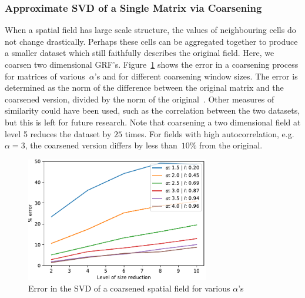 \documentclass[ijgi,article,submit,moreauthors,pdftex,10pt,a4paper]{Definitions/mdpi}
\begin{document}
\subsubsection{Approximate SVD of a Single Matrix via Coarsening}
\label{sec:Results/Approximate SVD of a Single Matrix via Coarsening}
When a spatial field has large scale structure, the values of neighbouring cells do not change drastically. Perhaps these cells can be aggregated together to produce a smaller dataset which still faithfully describes the original field. Here, we coarsen two dimensional GRF's. Figure~\ref{fig:plotSingleSpatialFieldViaCoarsening} shows the error in a coarsening process for matrices of various~$\alpha$'s and for different coarsening window sizes. The error is determined as the norm of the difference between the original matrix and the coarsened version, divided by the norm of the original~\cite{Bogaardt2018}. Other measures of similarity could have been used, such as the correlation between the two datasets, but this is left for future research. Note that coarsening a two dimensional field at level 5 reduces the dataset by $25$ times. For fields with high autocorrelation, e.g. $\alpha=3$, the coarsened version differs by less than~$10\%$ from the original.

\begin{figure}[H]
\centering
\includegraphics[width=80mm]{Results/plotSingleSpatialFieldViaCoarsening.pdf}
\caption[Error after coarsening]{Error in the SVD of a coarsened spatial field for various $\alpha$'s}
\label{fig:plotSingleSpatialFieldViaCoarsening}
\end{figure}
\end{document}
